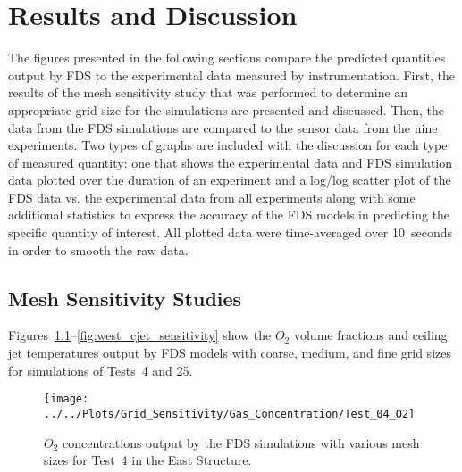 \renewcommand{\thechapter}{5}

\chapter{Results and Discussion}
\label{chap:results_disc}
The figures presented in the following sections compare the predicted quantities output by FDS to the experimental data measured by instrumentation. First, the results of the mesh sensitivity study that was performed to determine an appropriate grid size for the simulations are presented and discussed. Then, the data from the FDS simulations are compared to the sensor data from the nine experiments. Two types of graphs are included with the discussion for each type of measured quantity: one that shows the experimental data and FDS simulation data plotted over the duration of an experiment and a log/log scatter plot of the FDS data vs. the experimental data from all experiments along with some additional statistics to express the accuracy of the FDS models in predicting the specific quantity of interest. All plotted data were time-averaged over 10~seconds in order to smooth the raw data.

\section{Mesh Sensitivity Studies}
\label{sec:mesh_studies}
Figures~\ref{fig:east_O2_sensitivity}--\ref{fig:west_cjet_sensitivity} show the $O_2$ volume fractions and ceiling jet temperatures output by FDS models with coarse, medium, and fine grid sizes for simulations of Tests~4 and 25.
\begin{figure}[!h]
	\centering
	\texttt{[image: ../../Plots/Grid\_Sensitivity/Gas\_Concentration/Test\_04\_O2]}
	\caption[$O_2$ concentrations for East Structure simulations of various mesh sizes.]{$O_2$ concentrations output by the FDS simulations with various mesh sizes for Test~4 in the East Structure.}
	\label{fig:east_O2_sensitivity}
\end{figure}

